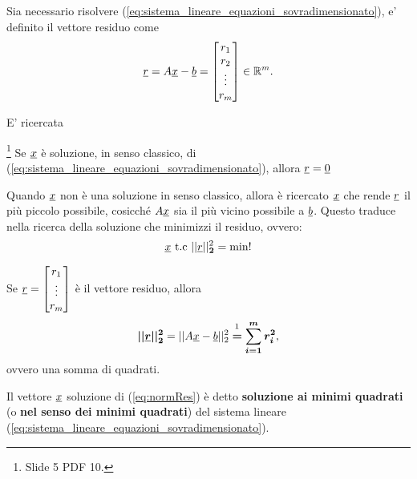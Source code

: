 \begin{definition}
	Sia necessario risolvere (\ref{eq:sistema_lineare_equazioni_sovradimensionato}), e' definito il vettore residuo come
	\begin{equation}\label{eq:vettore_residuo}
		\uline r = A\uline x-\uline b=
		\begin{bmatrix}
			r_1\\
			r_2\\
			\vdots\\
			r_m
		\end{bmatrix}
		\in\mathbb R^m.
	\end{equation}
\end{definition}

E' ricercata 

\begin{remark}\footnote{Slide 5 PDF 10.}
    Se $\uline x$ è soluzione, in senso classico, di (\ref{eq:sistema_lineare_equazioni_sovradimensionato}), allora $\uline r=\uline 0$
\end{remark}

Quando $\uline x$ non è una soluzione in senso classico, allora è ricercato $\uline x$ che rende $\uline r$ il più piccolo possibile, cosicché $A\uline x$ sia il più vicino possibile a $\uline b$. Questo traduce nella ricerca della soluzione  che minimizzi il residuo, ovvero:
\begin{equation}\label{eq:normRes}
    \uline x\text{ t.c }||\uline r||_{\boldsymbol 2}^2=\min!
\end{equation}
\begin{remark}
    Se $\uline r=\begin{bmatrix}
        r_1\\
        \vdots\\
        r_m
    \end{bmatrix}$ è il vettore residuo, allora
    \begin{equation}\label{eq:resNorm2}
        \boldsymbol{||\uline r||_2^2} = ||A\uline x - \uline b||_2^2 \overset{\footnotemark}{\boldsymbol =} \boldsymbol{\sum_{i=1}^m r_i^2},
    \end{equation}
    ovvero una somma di quadrati.
\end{remark}

\begin{definition}\label{def:soluzione_minimi_quadrati}
    Il vettore $\uline x$ soluzione di (\ref{eq:normRes}) è detto \textbf{soluzione ai minimi quadrati} (o \textbf{nel senso dei minimi quadrati}) del sistema lineare (\ref{eq:sistema_lineare_equazioni_sovradimensionato}). 
\end{definition}

